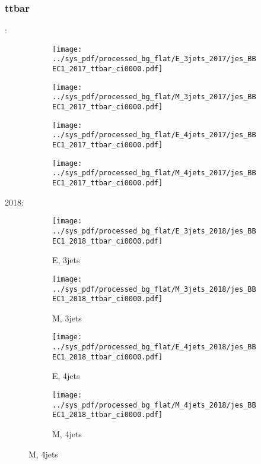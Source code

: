 \documentclass{beamer}
\begin{document}
\begin{frame}
\frametitle{ttbar}
\fontsize{5}{1}:
\begin{figure}
\centering
\begin{subfigure}[b]{0.24\textwidth}
\texttt{[image: ../sys\_pdf/processed\_bg\_flat/E\_3jets\_2017/jes\_BBEC1\_2017\_ttbar\_ci0000.pdf]}
\end{subfigure}
\begin{subfigure}[b]{0.24\textwidth}
\texttt{[image: ../sys\_pdf/processed\_bg\_flat/M\_3jets\_2017/jes\_BBEC1\_2017\_ttbar\_ci0000.pdf]}
\end{subfigure}
\begin{subfigure}[b]{0.24\textwidth}
\texttt{[image: ../sys\_pdf/processed\_bg\_flat/E\_4jets\_2017/jes\_BBEC1\_2017\_ttbar\_ci0000.pdf]}
\end{subfigure}
\begin{subfigure}[b]{0.24\textwidth}
\texttt{[image: ../sys\_pdf/processed\_bg\_flat/M\_4jets\_2017/jes\_BBEC1\_2017\_ttbar\_ci0000.pdf]}
\end{subfigure}
\end{figure}
2018:
\begin{figure}
\centering
\begin{subfigure}[b]{0.24\textwidth}
\texttt{[image: ../sys\_pdf/processed\_bg\_flat/E\_3jets\_2018/jes\_BBEC1\_2018\_ttbar\_ci0000.pdf]}
\captionsetup{font=tiny}
\caption{E, 3jets}
\end{subfigure}
\begin{subfigure}[b]{0.24\textwidth}
\texttt{[image: ../sys\_pdf/processed\_bg\_flat/M\_3jets\_2018/jes\_BBEC1\_2018\_ttbar\_ci0000.pdf]}
\captionsetup{font=tiny}
\caption{M, 3jets}
\end{subfigure}
\begin{subfigure}[b]{0.24\textwidth}
\texttt{[image: ../sys\_pdf/processed\_bg\_flat/E\_4jets\_2018/jes\_BBEC1\_2018\_ttbar\_ci0000.pdf]}
\captionsetup{font=tiny}
\caption{E, 4jets}
\end{subfigure}
\begin{subfigure}[b]{0.24\textwidth}
\texttt{[image: ../sys\_pdf/processed\_bg\_flat/M\_4jets\_2018/jes\_BBEC1\_2018\_ttbar\_ci0000.pdf]}
\captionsetup{font=tiny}
\caption{M, 4jets}
\end{subfigure}
\end{figure}
\end{frame}
\end{document}
